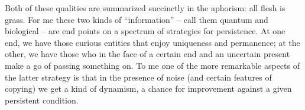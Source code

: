 Both of these qualities are summarized succinctly in the aphorism: all
flesh is grass. For me these two kinds of ``information'' -- call them
quantum and biological -- are end points on a spectrum of strategies
for persistence. At one end, we have those curious entities that enjoy
uniqueness and permanence; at the other, we have those who in the face
of a certain end and an uncertain present make a go of passing
something on. To me one of the more remarkable aspects of the latter
strategy is that in the presence of noise (and certain features of
copying) we get a kind of dynamism, a chance for improvement against a
given persistent condition.



